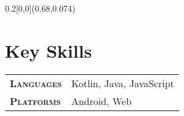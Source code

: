 \documentclass[a4paper, oneside, final]{scrartcl} %
\newcommand{\subSecHeadWidth}{2.1cm}
\begin{document}
\begin{center} %


{\hspace{-3.8cm} \fontsize{34}{34}\selectfont\scshape {\thinfont \myname} {\bodyfont \mysurname}} %

\vspace{1.2cm} %



\begin{textblock}{0.2}[0,0](0.68,0.074)
\begin{flushright}
\thinfont{
\mymailaddress \\ %
{\Large\Letter} \myemail \\
{\Large\Telefon} \mymobile %
}
\end{flushright}
\end{textblock}



\section{Key Skills}

\begin{tabularx}{0.97\linewidth}{>{\raggedleft\scshape}p{\subSecHeadWidth}X}
\textbf{Languages} & Kotlin, Java, JavaScript \\
\textbf{Platforms} & Android, Web \\
\end{tabularx}



\end{center}
\end{document}
